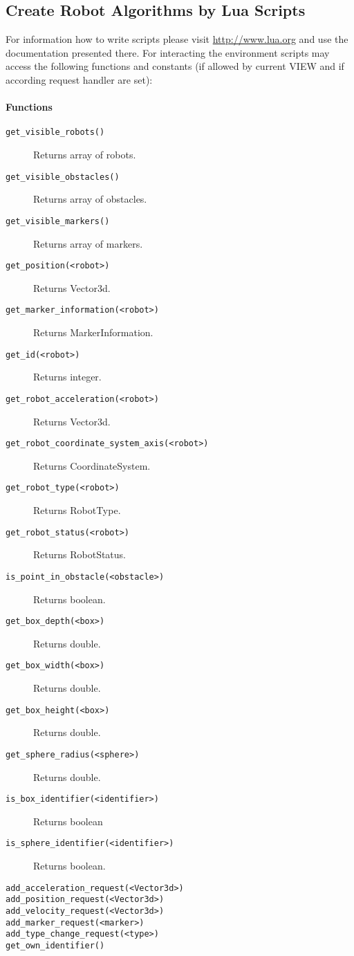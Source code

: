 \documentclass[a4paper,halfparskip,11pt,twoside]{scrartcl}
\begin{document}
\subsection{Create Robot Algorithms by Lua Scripts}
For information how to write \Lua scripts please visit \url{http://www.lua.org} and use the documentation presented there. For interacting the environment \Lua scripts may access the following functions and constants (if allowed by current VIEW and if according request handler are set):

\paragraph{\Lua Functions}
\begin{description}
	\item [\texttt{get\_visible\_robots()}] Returns array of robots.
	\item [\texttt{get\_visible\_obstacles()}] Returns array of obstacles.
	\item [\texttt{get\_visible\_markers()}] Returns array of markers.
	\item [\texttt{get\_position(<robot>)}] Returns Vector3d.
	\item [\texttt{get\_marker\_information(<robot>)}] Returns MarkerInformation.
	\item [\texttt{get\_id(<robot>)}] Returns integer.
	\item [\texttt{get\_robot\_acceleration(<robot>)}] Returns Vector3d.
	\item [\texttt{get\_robot\_coordinate\_system\_axis(<robot>)}] Returns CoordinateSystem.
	\item [\texttt{get\_robot\_type(<robot>)}] Returns RobotType.
	\item [\texttt{get\_robot\_status(<robot>)}] Returns RobotStatus.
	\item [\texttt{is\_point\_in\_obstacle(<obstacle>)}] Returns boolean.
	\item [\texttt{get\_box\_depth(<box>)}] Returns double.
	\item [\texttt{get\_box\_width(<box>)}] Returns double.
	\item [\texttt{get\_box\_height(<box>)}] Returns double.
	\item [\texttt{get\_sphere\_radius(<sphere>)}] Returns double.
	\item [\texttt{is\_box\_identifier(<identifier>)}] Returns boolean
	\item [\texttt{is\_sphere\_identifier(<identifier>)}] Returns boolean.
	\item [\texttt{add\_acceleration\_request(<Vector3d>)}]
	\item [\texttt{add\_position\_request(<Vector3d>)}]
	\item [\texttt{add\_velocity\_request(<Vector3d>)}]
	\item [\texttt{add\_marker\_request(<marker>)}]
	\item [\texttt{add\_type\_change\_request(<type>)}]
	\item [\texttt{get\_own\_identifier()}]
\end{description}
\end{document}
